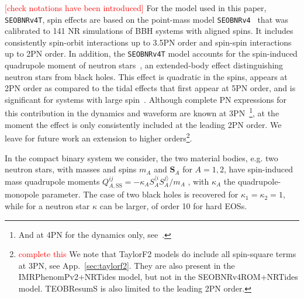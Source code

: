 \documentclass[prd,aps,letter,twocolumn,floatfix,notitlepage,nofootinbib]{revtex4-1}
\newcommand{\mr}{\mathrm}
\newcommand{\bs}{\boldsymbol}
\newcommand{\red}[1]{\textcolor{red}{#1}}
\begin{document}
\red{[check notations have been introduced]} For the model used in this paper, \texttt{SEOBNRv4T}, spin effects are based on the point-mass model \texttt{SEOBNRv4}~\cite{Bohe:2016gbl} that was calibrated to 141 NR simulations of BBH systems with aligned spins. It includes consistently spin-orbit interactions up to 3.5PN order and spin-spin interactions up to 2PN order. In addition, the \texttt{SEOBNRv4T} model accounts for the spin-induced quadrupole moment of neutron stars~\cite{Poisson1998}, an extended-body effect distinguishing neutron stars from black holes. This effect is quadratic in the spins, appears at 2PN order as compared to the tidal effects that first appear at 5PN order, and is significant for systems with large spin~\cite{HarryHinderer2018}. Although complete PN expressions for this contribution in the dynamics and waveform are known at 3PN~\cite{Bohe:2015ana}\footnote{And at 4PN for the dynamics only, see~\cite{}.}, at the moment the effect is only consistently included at the leading 2PN order. We leave for future work an extension to higher orders\footnote{\red{complete this} We note that TaylorF2 models do include all spin-square terms at 3PN, see App.~\ref{sec:taylorf2}. They are also present in the IMRPhenomPv2+NRTides model, but not in the SEOBNRv4ROM+NRTides model. TEOBResumS is also limited to the leading 2PN order.}.

In the compact binary system we consider, the two material bodies, e.g. two neutron stars, with masses and spins $m_{A}$ and $\bs{S}_{A}$ for $A=1,2$, have spin-induced mass quadrupole moments $Q_{A,\mr{SS}}^{ij}=-\kappa_A S_A^{\langle i}S_A^{j\rangle}/m_A$ \cite{Poisson1998}, with $\kappa_{A}$ the quadrupole-monopole parameter. The case of two black holes is recovered for $\kappa_1=\kappa_2=1$, while for a neutron star $\kappa$ can be larger, of order 10 for hard EOSs.
\end{document}
